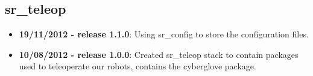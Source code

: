 
\subsection{sr\_teleop}
\label{sec:sr-teleop-changelog}

\begin{itemize}
\item \textbf{19/11/2012 - release 1.1.0}: Using sr\_config to store the configuration files.
\item \textbf{10/08/2012 - release 1.0.0}: Created sr\_teleop stack to contain packages used to teleoperate our robots, contains the cyberglove package.
\end{itemize}